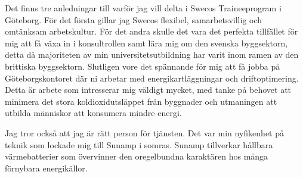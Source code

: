 \documentclass[11pt,a4paper,sans]{moderncv}        %
\begin{document}

Det finns tre anledningar till varf{\"o}r jag vill delta i Swecos Traineeprogram i G{\"o}teborg.
F{\"o}r det f{\"o}rsta gillar jag Swecos flexibel, samarbetsvillig och omt{\"a}nksam arbetskultur.
F{\"o}r det andra skulle det vara det perfekta tillf{\"a}llet f{\"o}r mig att f{\aa} v{\"a}xa in i konsultrollen samt l{\"a}ra mig om den svenska byggsektorn, detta d{\aa} majoriteten av min universitetsutbildning har varit inom ramen av den brittiska byggsektorn.
Slutligen vore det sp{\"a}nnande f{\"o}r mig att f{\aa} jobba p{\aa} G{\"o}teborgskontoret d{\"a}r ni arbetar med energikartl{\"a}ggningar och driftoptimering.
Detta {\"a}r arbete som intresserar mig v{\"a}ldigt mycket, med tanke p{\aa} behovet att minimera det stora koldioxidutsl{\"a}ppet fr{\aa}n byggnader och utmaningen att utbilda m{\"a}nniskor att konsumera mindre energi.



Jag tror ocks{\aa} att jag {\"a}r r{\"a}tt person f{\"o}r tj{\"a}nsten.
Det var min nyfikenhet p{\aa} teknik som lockade mig till Sunamp i somras.
Sunamp tillverkar h{\aa}llbara v{\"a}rmebatterier som {\"o}vervinner den oregelbundna karakt{\"a}ren hos m{\aa}nga f{\"o}rnybara energik{\"a}llor.
\end{document}
